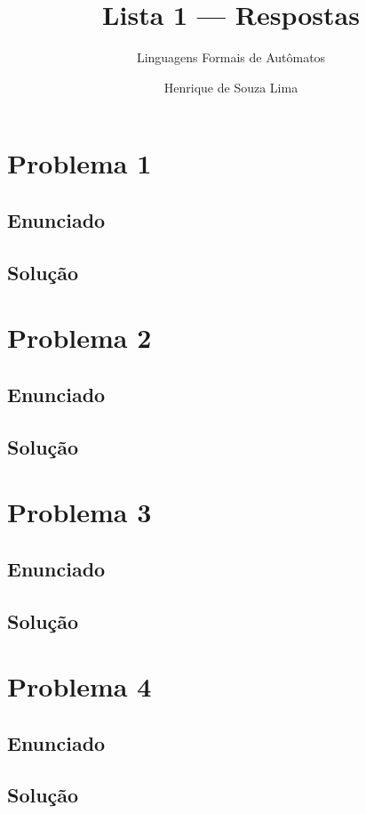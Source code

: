 \documentclass[a4paper, 12pt]{scrartcl}
\title{Lista 1 --- Respostas}
\subtitle{Linguagens Formais de Autômatos}
\author{Henrique de Souza Lima}
\begin{document}
\maketitle


\section*{Problema 1}

\subsection*{Enunciado}

\subsection*{Solução}


\section*{Problema 2}

\subsection*{Enunciado}

\subsection*{Solução}


\section*{Problema 3}

\subsection*{Enunciado}

\subsection*{Solução}


\section*{Problema 4}

\subsection*{Enunciado}

\subsection*{Solução}
\end{document}
